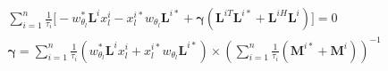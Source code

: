 \begin{align*}
    & \sum_{i=1}^n \frac{1}{\tau_i} \Bigg[  - w_{\theta_{l}}^* \mathbf{L}^{i} x_{l}^i  - x_{l}^{i*} w_{\theta_{l}} \mathbf{L}^{i*} + \boldsymbol{\gamma} \left(\mathbf{L}^{iT} \mathbf{L}^{i*} + \mathbf{L}^{iH} \mathbf{L}^{i} \right)  \Bigg] = 0\\
    &\boldsymbol{\gamma} = \sum_{i=1}^n \frac{1}{\tau_i} \left( w_{\theta_{l}}^* \mathbf{L}^{i} x_{l}^i  + x_{l}^{i*} w_{\theta_{l}} \mathbf{L}^{i*} \right) \times \left( \sum_{i=1}^n \frac{1}{\tau_i} \left(\mathbf{M}^{i*} + \mathbf{M}^i \right) \right)^{-1}
\end{align*}
